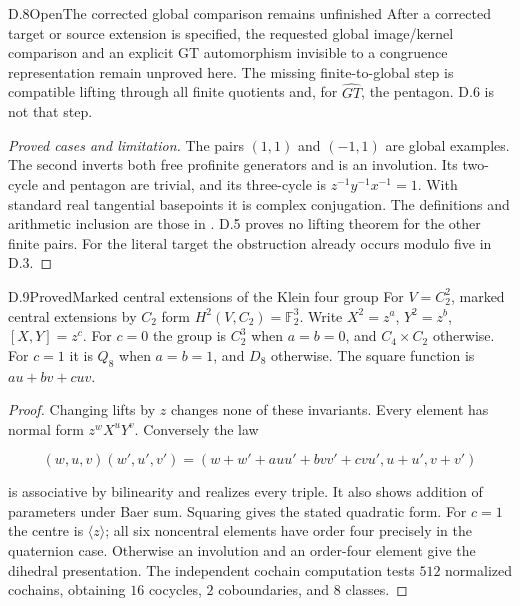 \begin{statement}{D.8}{Open}{The corrected global comparison remains unfinished}
After a corrected target or source extension is specified,
the requested global image/kernel comparison and an explicit
GT automorphism invisible to a congruence representation
remain unproved here. The missing finite-to-global step is
compatible lifting through all finite quotients and, for
$\widehat{GT}$, the pentagon. D.6 is not that step.
\end{statement}
\begin{proof}[Proved cases and limitation]
The pairs $(1,1)$ and $(-1,1)$ are global examples.
The second inverts both free profinite generators and is
an involution. Its two-cycle and pentagon are trivial,
and its three-cycle is $z^{-1}y^{-1}x^{-1}=1$.
With standard real tangential basepoints it is complex
conjugation. The definitions and arithmetic inclusion
are those in \cite[Section 0.1 and Main Theorem]{D_HS}.
D.5 proves no lifting theorem for the other finite pairs.
For the literal target the obstruction already occurs
modulo five in D.3.
\end{proof}

\begin{statement}{D.9}{Proved}{Marked central extensions of the Klein four group}
For $V=C_2^2$, marked central extensions by $C_2$
form $H^2(V,C_2)=\mathbb F_2^3$.
Write $X^2=z^a$, $Y^2=z^b$, $[X,Y]=z^c$.
For $c=0$ the group is $C_2^3$ when $a=b=0$,
and $C_4\times C_2$ otherwise.
For $c=1$ it is $Q_8$ when $a=b=1$, and $D_8$ otherwise.
The square function is $au+bv+cuv$.
\end{statement}
\begin{proof}
Changing lifts by $z$ changes none of these invariants.
Every element has normal form $z^wX^uY^v$.
Conversely the law

$$
(w,u,v)(w',u',v')=
 (w+w'+auu'+bvv'+cvu',u+u',v+v')
$$

is associative by bilinearity and realizes every triple.
It also shows addition of parameters under Baer sum.
Squaring gives the stated quadratic form.
For $c=1$ the centre is $\langle z\rangle$; all six
noncentral elements have order four precisely in the
quaternion case. Otherwise an involution and an order-four
element give the dihedral presentation.
The independent cochain computation tests $512$ normalized
cochains, obtaining $16$ cocycles, $2$ coboundaries,
and $8$ classes.
\end{proof}

